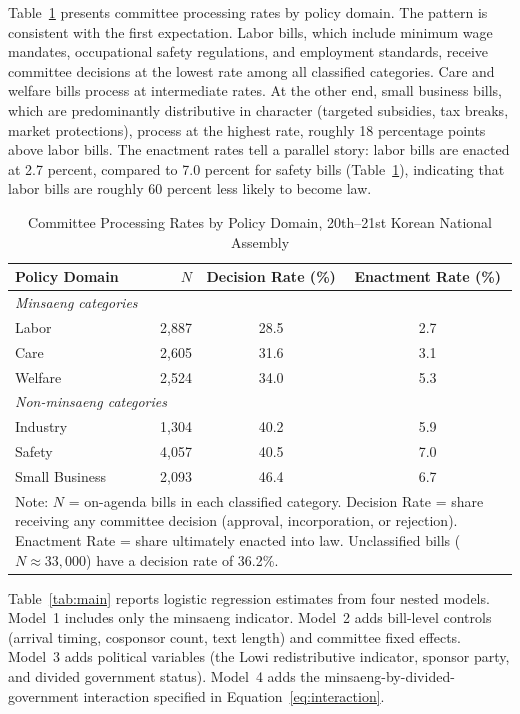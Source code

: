 \documentclass[11pt]{article}
\begin{document}
Table~\ref{tab:desc} presents committee processing rates by policy domain. The pattern is consistent with the first expectation. Labor bills, which include minimum wage mandates, occupational safety regulations, and employment standards, receive committee decisions at the lowest rate among all classified categories. Care and welfare bills process at intermediate rates. At the other end, small business bills, which are predominantly distributive in character (targeted subsidies, tax breaks, market protections), process at the highest rate, roughly 18 percentage points above labor bills. The enactment rates tell a parallel story: labor bills are enacted at 2.7 percent, compared to 7.0 percent for safety bills (Table~\ref{tab:desc}), indicating that labor bills are roughly 60 percent less likely to become law.

\begin{table}[H]
\centering
\caption{Committee Processing Rates by Policy Domain, 20th--21st Korean National Assembly}
\label{tab:desc}
\begin{tabular}{lrcc}
\toprule
Policy Domain & $N$ & Decision Rate (\%) & Enactment Rate (\%) \\
\midrule
\multicolumn{4}{l}{\textit{Minsaeng categories}} \\
\quad Labor & 2,887 & 28.5 & 2.7 \\
\quad Care & 2,605 & 31.6 & 3.1 \\
\quad Welfare & 2,524 & 34.0 & 5.3 \\
\midrule
\multicolumn{4}{l}{\textit{Non-minsaeng categories}} \\
\quad Industry & 1,304 & 40.2 & 5.9 \\
\quad Safety & 4,057 & 40.5 & 7.0 \\
\quad Small Business & 2,093 & 46.4 & 6.7 \\
\bottomrule
\multicolumn{4}{p{0.85\textwidth}}{\footnotesize Note: $N$ = on-agenda bills in each classified category. Decision Rate = share receiving any committee decision (approval, incorporation, or rejection). Enactment Rate = share ultimately enacted into law. Unclassified bills ($N \approx 33{,}000$) have a decision rate of 36.2\%.} \\
\end{tabular}
\end{table}

Table~\ref{tab:main} reports logistic regression estimates from four nested models. Model~1 includes only the minsaeng indicator. Model~2 adds bill-level controls (arrival timing, cosponsor count, text length) and committee fixed effects. Model~3 adds political variables (the Lowi redistributive indicator, sponsor party, and divided government status). Model~4 adds the minsaeng-by-divided-government interaction specified in Equation~\ref{eq:interaction}.
\end{document}
